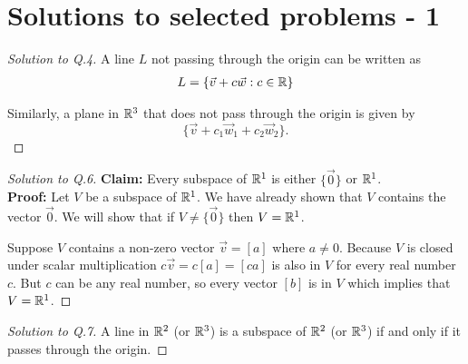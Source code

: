 

\section*{Solutions to selected problems - 1}

  \begin{proof}[Solution to Q.4]
    A line $L$ not passing through the origin can be written as
    \begin{align*}
      L = \{ \vec{v} + c \vec{w} : c \in \mathbb{R}\}
    \end{align*}
    \begin{figure}[H]
      \centering
    \end{figure}

    Similarly, a plane in $\mathbb{R}^3$ that does not pass through the origin is given by $$\{  \vec{v} + c_1 \vec{w}_1 + c_2 \vec{w}_2\}.$$
  \end{proof}





  \begin{proof}[Solution to Q.6]
    \textbf{Claim: }Every subspace of $\mathbb{R}^1$ is either $\{ \vec{0} \}$ or $\mathbb{R}^1$.\\
    \textbf{Proof: }
    Let $V$ be a subspace of $\mathbb{R}^1$.
    We have already shown that $V$ contains the vector $\vec{0}$.
    We will show that if $V \neq \{ \vec{0}\}$ then $V = \mathbb{R}^1$.

    Suppose $V$ contains a non-zero vector $\vec{v} = [a]$ where $a \neq 0$.
    Because $V$ is closed under scalar multiplication $c \vec{v} = c[a] = [ca]$ is also in $V$ for every real number $c$.
    But $c$ can be any real number, so every vector $[b]$ is in $V$ which implies that $V = \mathbb{R}^1$.
  \end{proof}

  \begin{proof}[Solution to Q.7]
    A line in $\mathbb{R}^2$ (or $\mathbb{R}^3$) is a subspace of $\mathbb{R}^2$ (or $\mathbb{R}^3$) if and only if it passes through the origin.
  \end{proof}

